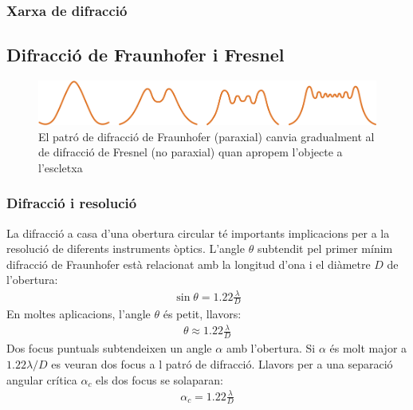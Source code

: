 \subsubsection*{Xarxa de difracció}

\subsection{Difracció de Fraunhofer i Fresnel}
\begin{figure}[H]
\centering
    \includegraphics[width=\textwidth]{images/6/65-fraunhofer-fresnel.png}
\caption{El patró de difracció de Fraunhofer (paraxial) canvia gradualment al de difracció de Fresnel (no paraxial) quan apropem l'objecte a l'escletxa}
\end{figure}

\subsubsection*{Difracció i resolució}
La difracció a casa d'una obertura circular té importants implicacions per a la resolució de diferents instruments òptics. L'angle $\theta$ subtendit pel primer mínim difracció de Fraunhofer està relacionat amb la longitud d'ona i el diàmetre $D$ de l'obertura:
\begin{align}
    \boxed{\sin \theta = 1.22 \frac{\lambda}{D}}
\end{align}
En moltes aplicacions, l'angle $\theta$ és petit, llavors:
\begin{align}
    \theta \approx 1.22 \frac{\lambda}{D}
\end{align}
Dos focus puntuals subtendeixen un angle $\alpha$ amb l'obertura. Si $\alpha$ és molt major a $1.22 \lambda / D$ es veuran dos focus a l patró de difracció. Llavors per a una separació angular crítica $\alpha_{c}$ els dos focus se solaparan:
\begin{align}
    \boxed{\alpha_{c} = 1.22 \frac{\lambda}{D}}
\end{align}